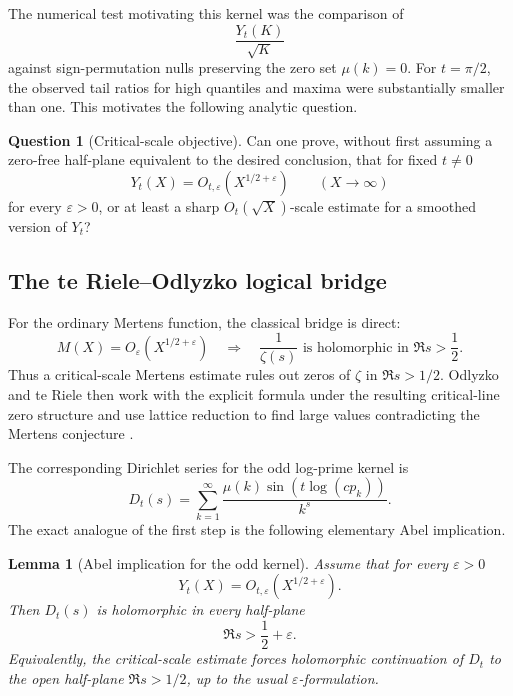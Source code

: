 \documentclass[11pt]{amsart}
\numberwithin{equation}{section}
\theoremstyle{plain}
\newtheorem{lemma}[theorem]{Lemma}
\theoremstyle{definition}
\newtheorem{question}[theorem]{Question}
\theoremstyle{remark}
\begin{document}
The numerical test motivating this kernel was the comparison of
\begin{equation}
\frac{Y_t(K)}{\sqrt K}
\label{eq:Yt_normalized}
\end{equation}
against sign-permutation nulls preserving the zero set \(\mu(k)=0\).  For \(t=\pi/2\), the observed tail ratios for high quantiles and maxima were substantially smaller than one.  This motivates the following analytic question.

\begin{question}[Critical-scale objective]
\label{ques:Yt_critical_scale_objective}
Can one prove, without first assuming a zero-free half-plane equivalent to the desired conclusion, that for fixed \(t\neq0\)
\begin{equation}
Y_t(X)=O_{t,\varepsilon}\left(X^{1/2+\varepsilon}\right)
\qquad (X\to\infty)
\label{eq:Yt_critical_bound_goal}
\end{equation}
for every \(\varepsilon>0\), or at least a sharp \(O_t(\sqrt X)\)-scale estimate for a smoothed version of \(Y_t\)?
\end{question}

\subsection{The te Riele--Odlyzko logical bridge}
\label{subsec:Yt_te_riele_bridge}

For the ordinary Mertens function, the classical bridge is direct:
\begin{equation}
M(X)=O_\varepsilon(X^{1/2+\varepsilon})
\quad\Longrightarrow\quad
\frac1{\zeta(s)} \text{ is holomorphic in } \Re s>\frac12.
\label{eq:mertens_bridge_standard}
\end{equation}
Thus a critical-scale Mertens estimate rules out zeros of \(\zeta\) in \(\Re s>1/2\).  Odlyzko and te Riele then work with the explicit formula under the resulting critical-line zero structure and use lattice reduction to find large values contradicting the Mertens conjecture \cite{OdlyzkoTeRiele1985}.

The corresponding Dirichlet series for the odd log-prime kernel is
\begin{equation}
D_t(s)=\sum_{k=1}^{\infty}\frac{\mu(k)\sin(t\log(c p_k))}{k^s}.
\label{eq:Dt_definition}
\end{equation}
The exact analogue of the first step is the following elementary Abel implication.

\begin{lemma}[Abel implication for the odd kernel]
\label{lem:Yt_abel_implication}
Assume that for every \(\varepsilon>0\)
\begin{equation}
Y_t(X)=O_{t,\varepsilon}(X^{1/2+\varepsilon}).
\label{eq:Yt_abel_assumption}
\end{equation}
Then \(D_t(s)\) is holomorphic in every half-plane
\begin{equation}
\Re s>\frac12+\varepsilon.
\label{eq:Dt_holomorphic_halfplane}
\end{equation}
Equivalently, the critical-scale estimate forces holomorphic continuation of \(D_t\) to the open half-plane \(\Re s>1/2\), up to the usual \(\varepsilon\)-formulation.
\end{lemma}
\end{document}
